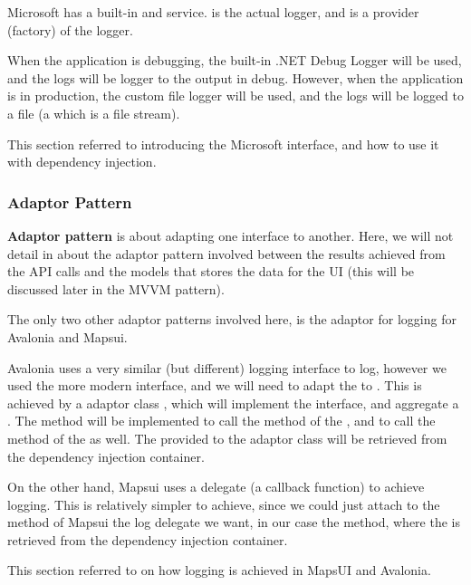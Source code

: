 Microsoft has a built-in  and  service.  is the actual logger, and  is a provider (factory) of the logger.

When the application is debugging, the built-in .NET Debug Logger will be used, and the logs will be logger to the output in debug. However, when the application is in production, the custom file logger will be used, and the logs will be logged to a file (a  which is a file stream).

This section referred to \autocite{dotnet-tutorial-logging} introducing the Microsoft  interface, and how to use it with dependency injection.

\subsubsection{Adaptor Pattern}

\textbf{Adaptor pattern} is about adapting one interface to another. Here, we will not detail in about the adaptor pattern involved between the results achieved from the API calls and the models that stores the data for the UI (this will be discussed later in the MVVM pattern).

The only two other adaptor patterns involved here, is the adaptor for logging for Avalonia and Mapsui.

Avalonia uses a very similar (but different) logging interface  to log, however we used the more modern  interface, and we will need to adapt the  to . This is achieved by a adaptor class , which will implement the  interface, and aggregate a . The  method will be implemented to call the  method of the , and  to call the  method of the  as well. The  provided to the adaptor class will be retrieved from the dependency injection container.

On the other hand, Mapsui uses a delegate (a callback function) to achieve logging. This is relatively simpler to achieve, since we could just attach to the  method of Mapsui the log delegate we want, in our case the  method, where the  is retrieved from the dependency injection container.

This section referred to \autocite{mapsui-logging, avalonia-logging} on how logging is achieved in MapsUI and Avalonia.

